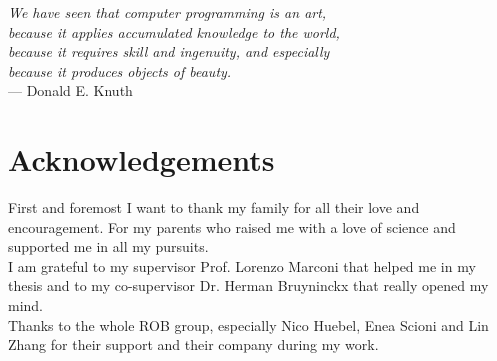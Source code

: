 

\begin{flushright}{\slshape    
We have seen that computer programming is an art, \\ 
because it applies accumulated knowledge to the world, \\ 
because it requires skill and ingenuity, and especially \\
because it produces objects of beauty.} \\ \medskip
--- {Donald E. Knuth}
\end{flushright}

\bigskip


\begingroup

\let\clearpage\relax
\let\cleardoublepage\relax
\let\cleardoublepage\relax

\chapter*{Acknowledgements}

First and foremost I want to thank my family for all their love and encouragement. For my parents who raised me with a love of science and supported me in all my pursuits.\\
I am grateful to my supervisor Prof. Lorenzo Marconi that helped me in my thesis and to my co-supervisor Dr. Herman Bruyninckx that really opened my mind.\\
Thanks to the whole ROB group, especially Nico Huebel, Enea Scioni and Lin Zhang for their support and their company during my work.

\endgroup